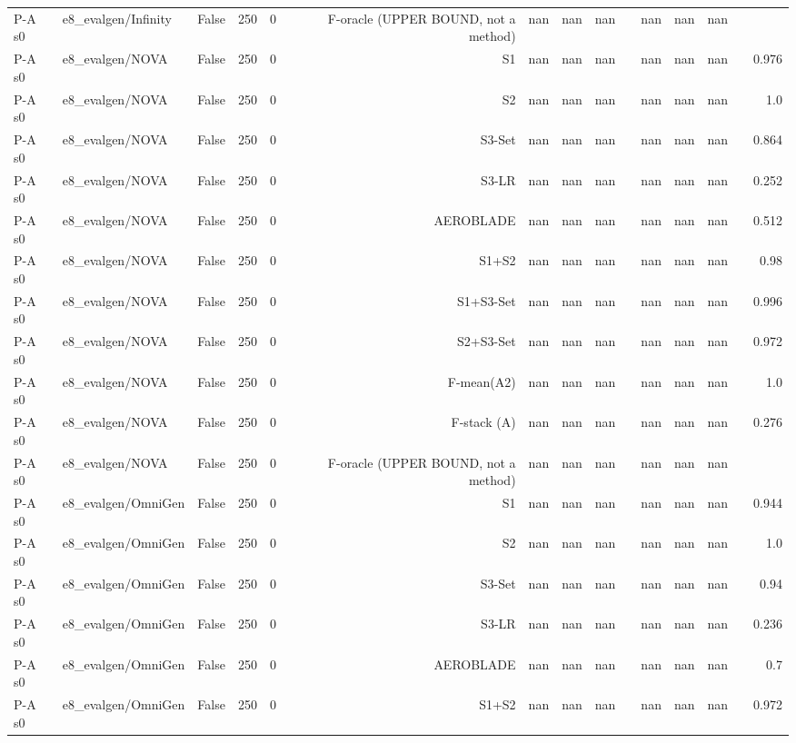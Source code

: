 \begin{table}[htbp]
\begin{tabular}{llrrrrrrrrrrrrr}
P-A s0 & e8\_evalgen/Infinity & False & 250 & 0 & F-oracle (UPPER BOUND, not a method) & nan & nan & nan &  & nan & nan & nan &  &  \\
P-A s0 & e8\_evalgen/NOVA & False & 250 & 0 & S1 & nan & nan & nan &  & nan & nan & nan &  & 0.976 \\
P-A s0 & e8\_evalgen/NOVA & False & 250 & 0 & S2 & nan & nan & nan &  & nan & nan & nan &  & 1.0 \\
P-A s0 & e8\_evalgen/NOVA & False & 250 & 0 & S3-Set & nan & nan & nan &  & nan & nan & nan &  & 0.864 \\
P-A s0 & e8\_evalgen/NOVA & False & 250 & 0 & S3-LR & nan & nan & nan &  & nan & nan & nan &  & 0.252 \\
P-A s0 & e8\_evalgen/NOVA & False & 250 & 0 & AEROBLADE & nan & nan & nan &  & nan & nan & nan &  & 0.512 \\
P-A s0 & e8\_evalgen/NOVA & False & 250 & 0 & S1+S2 & nan & nan & nan &  & nan & nan & nan &  & 0.98 \\
P-A s0 & e8\_evalgen/NOVA & False & 250 & 0 & S1+S3-Set & nan & nan & nan &  & nan & nan & nan &  & 0.996 \\
P-A s0 & e8\_evalgen/NOVA & False & 250 & 0 & S2+S3-Set & nan & nan & nan &  & nan & nan & nan &  & 0.972 \\
P-A s0 & e8\_evalgen/NOVA & False & 250 & 0 & F-mean(A2) & nan & nan & nan &  & nan & nan & nan &  & 1.0 \\
P-A s0 & e8\_evalgen/NOVA & False & 250 & 0 & F-stack (A) & nan & nan & nan &  & nan & nan & nan &  & 0.276 \\
P-A s0 & e8\_evalgen/NOVA & False & 250 & 0 & F-oracle (UPPER BOUND, not a method) & nan & nan & nan &  & nan & nan & nan &  &  \\
P-A s0 & e8\_evalgen/OmniGen & False & 250 & 0 & S1 & nan & nan & nan &  & nan & nan & nan &  & 0.944 \\
P-A s0 & e8\_evalgen/OmniGen & False & 250 & 0 & S2 & nan & nan & nan &  & nan & nan & nan &  & 1.0 \\
P-A s0 & e8\_evalgen/OmniGen & False & 250 & 0 & S3-Set & nan & nan & nan &  & nan & nan & nan &  & 0.94 \\
P-A s0 & e8\_evalgen/OmniGen & False & 250 & 0 & S3-LR & nan & nan & nan &  & nan & nan & nan &  & 0.236 \\
P-A s0 & e8\_evalgen/OmniGen & False & 250 & 0 & AEROBLADE & nan & nan & nan &  & nan & nan & nan &  & 0.7 \\
P-A s0 & e8\_evalgen/OmniGen & False & 250 & 0 & S1+S2 & nan & nan & nan &  & nan & nan & nan &  & 0.972 \\

\end{tabular}
\end{table}
